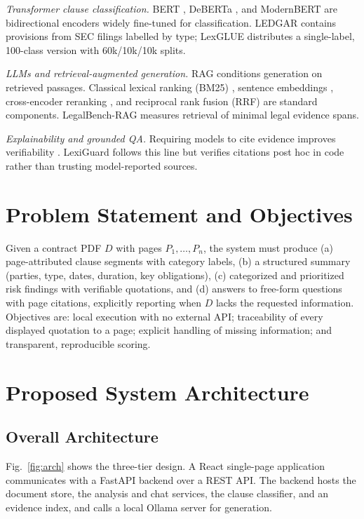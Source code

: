 \documentclass[conference]{IEEEtran}
\begin{document}
\textit{Transformer clause classification.} BERT \cite{devlin2019}, DeBERTa \cite{he2021,he2023}, and ModernBERT \cite{warner2024} are bidirectional encoders widely fine-tuned for classification. LEDGAR \cite{tuggener2020} contains provisions from SEC filings labelled by type; LexGLUE \cite{chalkidis2022} distributes a single-label, 100-class version with 60k/10k/10k splits.

\textit{LLMs and retrieval-augmented generation.} RAG \cite{lewis2020} conditions generation on retrieved passages. Classical lexical ranking (BM25) \cite{robertson2009}, sentence embeddings \cite{reimers2019}, cross-encoder reranking \cite{nogueira2019}, and reciprocal rank fusion (RRF) \cite{cormack2009} are standard components. LegalBench-RAG \cite{pipitone2024} measures retrieval of minimal legal evidence spans.

\textit{Explainability and grounded QA.} Requiring models to cite evidence improves verifiability \cite{gao2023}. LexiGuard follows this line but verifies citations post hoc in code rather than trusting model-reported sources.

\section{Problem Statement and Objectives}
Given a contract PDF $D$ with pages $P_1,\dots,P_n$, the system must produce (a) page-attributed clause segments with category labels, (b) a structured summary (parties, type, dates, duration, key obligations), (c) categorized and prioritized risk findings with verifiable quotations, and (d) answers to free-form questions with page citations, explicitly reporting when $D$ lacks the requested information. Objectives are: local execution with no external API; traceability of every displayed quotation to a page; explicit handling of missing information; and transparent, reproducible scoring.

\section{Proposed System Architecture}
\subsection{Overall Architecture}
Fig.~\ref{fig:arch} shows the three-tier design. A React single-page application communicates with a FastAPI backend over a REST API. The backend hosts the document store, the analysis and chat services, the clause classifier, and an evidence index, and calls a local Ollama server for generation.
\end{document}
